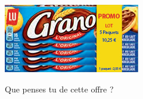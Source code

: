 
\begin{minipage}{0.4\linewidth}
\begin{center}
\includegraphics[scale=1]{Prop-2.jpg} 
\end{center}
\end{minipage}
\hfill
\begin{minipage}{0.4\linewidth}
Que penses tu de cette offre ?
\end{minipage}